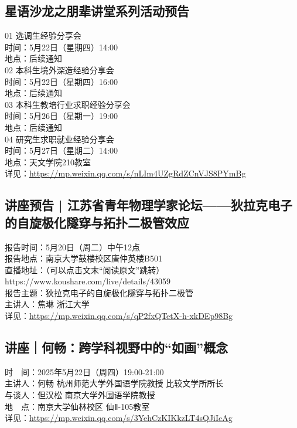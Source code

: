 \documentclass[letterpaper, 12pt]{article}
\begin{document}
\begin{multicols}{2}
\subsection{星语沙龙之朋辈讲堂系列活动预告} %
01 选调生经验分享会
\\时间：5月22日（星期四）14:00
\\地点：后续通知
\\02 本科生境外深造经验分享会
\\时间：5月22日（星期四）16:00
\\地点：后续通知
\\03 本科生教培行业求职经验分享会
\\时间：5月26日（星期一）19:00
\\地点：后续通知
\\04 研究生求职就业经验分享会
\\时间：5月27日（星期二）14:00
\\地点：天文学院210教室
\\详见：\url{https://mp.weixin.qq.com/s/nLIm4UZgRdZCnVJS8PYmBg}

\subsection{讲座预告 | 江苏省青年物理学家论坛——狄拉克电子的自旋极化隧穿与拓扑二极管效应} %
报告时间：5月20日（周二）中午12点
\\报告地点：南京大学鼓楼校区唐仲英楼B501
\\直播地址：（可以点击文末“阅读原文”跳转）
\\https://www.koushare.com/live/details/43059
\\报告主题：狄拉克电子的自旋极化隧穿与拓扑二极管
\\主讲人：焦琳 浙江大学
\\详见：\url{https://mp.weixin.qq.com/s/qP2fxQTetX-h-xkDEp98Bg}

\subsection{讲座｜何畅：跨学科视野中的“如画”概念} %
时　间：2025年5月22日（周四）19:00-21:00
\\主讲人：何畅 杭州师范大学外国语学院教授 比较文学所所长
\\与谈人：但汉松 南京大学外国语学院教授
\\地　点：南京大学仙林校区 仙Ⅱ-105教室
\\详见：\url{https://mp.weixin.qq.com/s/3YehCzKIKkzLT4sQJiIcAg}


\end{multicols}
\end{document}
